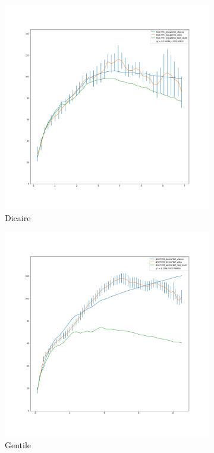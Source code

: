 \documentclass[reprint,%
 amsmath,amssymb,
 aps,
]{revtex4-1}
\begin{document}
  \begin{figure}[h]
\begin{subfigure}{.5\textwidth}
  \centering
  \includegraphics[width=.8\linewidth]{NGC7793_DicaireISO_XueSofue}
  \caption{Dicaire \cite{Dicaire1}}
  \label{fig:sfig11}
\end{subfigure}%
\begin{subfigure}{.5\textwidth}
  \centering
  \includegraphics[width=.8\linewidth]{NGC7793_GentileTaM_XueSofue}
  \caption{Gentile\cite{Gent}}
  \label{fig:sfig12}
\end{subfigure}
\begin{subfigure}{.5\textwidth}

\end{subfigure}
\end{figure}
\end{document}
